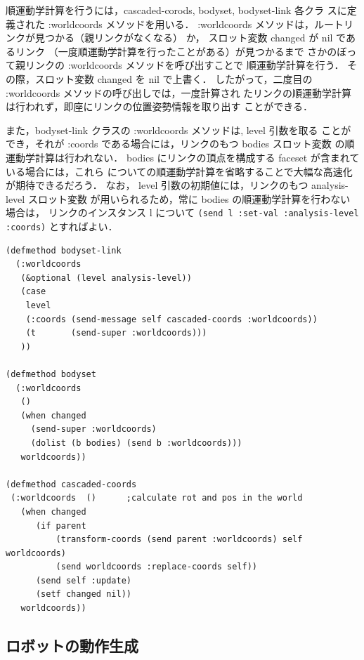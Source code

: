 順運動学計算を行うには，cascaded-corods, bodyset, bodyset-link 各クラ
スに定義された :worldcoords メソッドを用いる．
:worldcoords メソッドは，ルートリンクが見つかる（親リンクがなくなる）
か， スロット変数 changed が nil であるリンク
（一度順運動学計算を行ったことがある）が見つかるまで
さかのぼって親リンクの :worldcoords メソッドを呼び出すことで
順運動学計算を行う．
その際，スロット変数 changed を nil で上書く．
したがって，二度目の :worldcoords メソッドの呼び出しでは，一度計算され
たリンクの順運動学計算は行われず，即座にリンクの位置姿勢情報を取り出す
ことができる．

また，bodyset-link クラスの :worldcoords メソッドは, level 引数を取る
ことができ，それが :coords である場合には，リンクのもつ bodies スロット変数
の順運動学計算は行われない．
bodies にリンクの頂点を構成する faceset が含まれている場合には，これら
についての順運動学計算を省略することで大幅な高速化が期待できるだろう．
なお， level 引数の初期値には，リンクのもつ analysis-level スロット変数
が用いられるため，常に bodies の順運動学計算を行わない場合は，
リンクのインスタンス l について
\verb|(send l :set-val :analysis-level :coords)|
とすればよい．

{\baselineskip=10pt
\begin{verbatim}
(defmethod bodyset-link
  (:worldcoords
   (&optional (level analysis-level))
   (case
    level
    (:coords (send-message self cascaded-coords :worldcoords))
    (t       (send-super :worldcoords)))
   ))

(defmethod bodyset
  (:worldcoords
   ()
   (when changed
     (send-super :worldcoords)
     (dolist (b bodies) (send b :worldcoords)))
   worldcoords))

(defmethod cascaded-coords
 (:worldcoords  ()      ;calculate rot and pos in the world
   (when changed
      (if parent
          (transform-coords (send parent :worldcoords) self
worldcoords)
          (send worldcoords :replace-coords self))
      (send self :update)
      (setf changed nil))
   worldcoords))
\end{verbatim}
}

\subsection{ロボットの動作生成}


